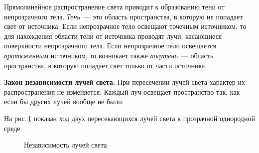 \documentclass[main.tex]{subfiles}
\begin{document}
Прямолинейное распространение света приводит к образованию тени от не\-прозрачного тела. \emph{Тень}~--- это область пространства, в которую не попадает свет от источника. Если непрозрачное тело освещают точечным источником, то для нахождения области тени от источника проводят лучи, касающиеся поверхности непрозрачного тела. Если непрозрачное тело освещается \emph{протяженным} источником, то возникает также \emph{полутень}~--- область пространства, в которую попадает свет только от части источника.
%
\begin{law}
    \textbf{Закон независимости лучей света.} При пересечении лучей света характер их распространения не изменяется. Каждый луч освещает пространство так, как если бы других лучей вообще не было.
\end{law}
%
На рис.\,\ref{fig:p174} показан ход двух пересекающихся лучей света в прозрачной однородной среде.
 
\begin{figure}[H]
    \centering

\caption{Независимость лучей света}
\label{fig:p174}
\end{figure}











  
\end{document}
